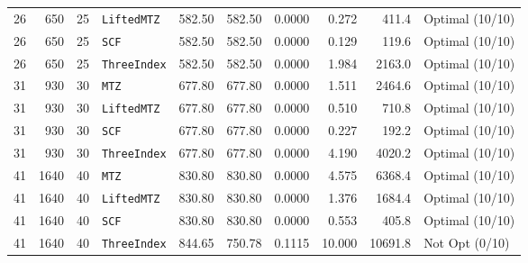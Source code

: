 \documentclass[11pt,a4paper]{article}
\begin{document}
\begin{table}[htbp]
\begin{tabular}{rrrlrrrrrl}
26 & 650 & 25 & \texttt{LiftedMTZ} & 582.50 & 582.50 & 0.0000 & 0.272 & 411.4 & Optimal (10/10) \\
26 & 650 & 25 & \texttt{SCF} & 582.50 & 582.50 & 0.0000 & 0.129 & 119.6 & Optimal (10/10) \\
26 & 650 & 25 & \texttt{ThreeIndex} & 582.50 & 582.50 & 0.0000 & 1.984 & 2163.0 & Optimal (10/10) \\
\midrule
31 & 930 & 30 & \texttt{MTZ} & 677.80 & 677.80 & 0.0000 & 1.511 & 2464.6 & Optimal (10/10) \\
31 & 930 & 30 & \texttt{LiftedMTZ} & 677.80 & 677.80 & 0.0000 & 0.510 & 710.8 & Optimal (10/10) \\
31 & 930 & 30 & \texttt{SCF} & 677.80 & 677.80 & 0.0000 & 0.227 & 192.2 & Optimal (10/10) \\
31 & 930 & 30 & \texttt{ThreeIndex} & 677.80 & 677.80 & 0.0000 & 4.190 & 4020.2 & Optimal (10/10) \\
\midrule
41 & 1640 & 40 & \texttt{MTZ} & 830.80 & 830.80 & 0.0000 & 4.575 & 6368.4 & Optimal (10/10) \\
41 & 1640 & 40 & \texttt{LiftedMTZ} & 830.80 & 830.80 & 0.0000 & 1.376 & 1684.4 & Optimal (10/10) \\
41 & 1640 & 40 & \texttt{SCF} & 830.80 & 830.80 & 0.0000 & 0.553 & 405.8 & Optimal (10/10) \\
41 & 1640 & 40 & \texttt{ThreeIndex} & 844.65 & 750.78 & 0.1115 & 10.000 & 10691.8 & Not Opt (0/10) \\
\bottomrule
\end{tabular}
\end{table}
\end{document}

